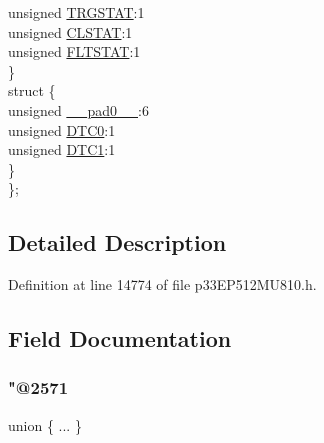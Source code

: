 \begin{DoxyCompactItemize}
\begin{tabbing}
\>\>unsigned \hyperlink{structtag_p_w_m_c_o_n4_b_i_t_s_a57c6135a12bae69a2a2cac5ed50a4a6d}{TRGSTAT}:1\\
\>\>unsigned \hyperlink{structtag_p_w_m_c_o_n4_b_i_t_s_a3ff6da0b6372a30fc64f07d769a3ddab}{CLSTAT}:1\\
\>\>unsigned \hyperlink{structtag_p_w_m_c_o_n4_b_i_t_s_ac4cd94e1f740f5bc85b265ed453769f0}{FLTSTAT}:1\\
\>\} \\
\>struct \{\\
\>\>unsigned \hyperlink{structtag_p_w_m_c_o_n4_b_i_t_s_adf71f3d8410c1f1dbbc96680a92c49af}{\_\_pad0\_\_}:6\\
\>\>unsigned \hyperlink{structtag_p_w_m_c_o_n4_b_i_t_s_a9aea5589386f8c7d9cb07683fc730825}{DTC0}:1\\
\>\>unsigned \hyperlink{structtag_p_w_m_c_o_n4_b_i_t_s_a41e45e30f2c99c731b1d2bca6060d8ad}{DTC1}:1\\
\>\} \\
\}; \\

\end{tabbing}\end{DoxyCompactItemize}


\subsection{Detailed Description}


Definition at line 14774 of file p33\+E\+P512\+M\+U810.\+h.



\subsection{Field Documentation}
\mbox{\label{structtag_p_w_m_c_o_n4_b_i_t_s_ac04c78898c72b93b978266eb5c535837}} 
\subsubsection{\texorpdfstring{"@2571}{@2571}}
{\footnotesize\ttfamily union \{ ... \} }

\mbox{\label{structtag_p_w_m_c_o_n4_b_i_t_s_adf71f3d8410c1f1dbbc96680a92c49af}} 
